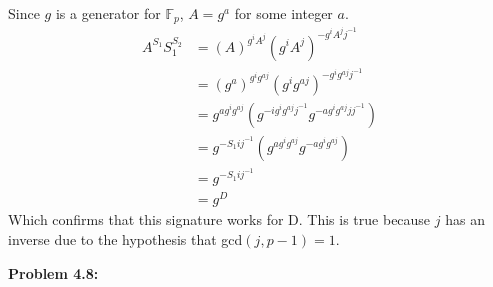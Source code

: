 \documentclass[a4paper, 11pt]{article}
\begin{document}
    Since $g$ is a generator for $\mathbb{F}_p$, $A=g^a$ for some integer $a$. 
    \begin{align*}
        A^{S_1}S_1^{S_2} &= (A)^{g^iA^j}(g^iA^j)^{-g^iA^{j}j^{-1}}\\
        &= (g^a)^{g^ig^{aj}}(g^ig^{aj})^{-g^ig^{aj}j^{-1}}\\
        &= g^{ag^ig^{aj}}(g^{-ig^ig^{aj}j^{-1}}g^{-ag^ig^{aj}jj^{-1}})\\
        &= g^{-S_1ij^{-1}}(g^{ag^ig^{aj}}g^{-ag^ig^{aj}})\\
        &= g^{-S_1ij^{-1}}\\
        &= g^D
    \end{align*}
    Which confirms that this signature works for D. This is true because $j$ has an inverse due to the hypothesis that gcd$(j,p-1) = 1$.
    
\noindent\textbf{Problem 4.8:}
    
\end{document}
